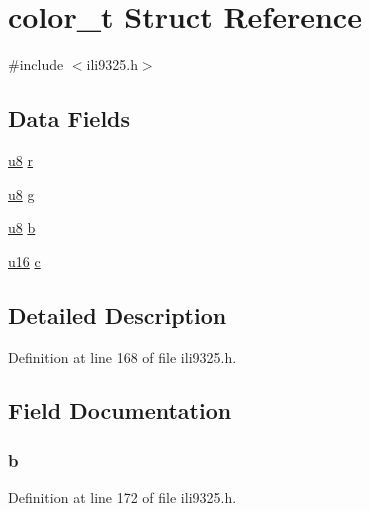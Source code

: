 \hypertarget{structcolor__t}{\section{color\-\_\-t Struct Reference}
\label{structcolor__t}
}


{\ttfamily \#include $<$ili9325.\-h$>$}

\subsection*{Data Fields}
\begin{DoxyCompactItemize}
\item 
\hyperlink{p8_2pinguino_2core_2typedef_8h_aed742c436da53c1080638ce6ef7d13de}{u8} \hyperlink{structcolor__t_a024565753c9b4a462348578bb2fe6757}{r}
\item 
\hyperlink{p8_2pinguino_2core_2typedef_8h_aed742c436da53c1080638ce6ef7d13de}{u8} \hyperlink{structcolor__t_a2e3999b42bd5cf9f9e7d87ef7c135544}{g}
\item 
\hyperlink{p8_2pinguino_2core_2typedef_8h_aed742c436da53c1080638ce6ef7d13de}{u8} \hyperlink{structcolor__t_a78ae961558b7587c97d0a87da7d56c4d}{b}
\item 
\hyperlink{p8_2pinguino_2core_2typedef_8h_a50b0d1c7a54fa09a64a3ac111c778520}{u16} \hyperlink{structcolor__t_afff0ae4fe505f5b27afed49e21dea41d}{c}
\end{DoxyCompactItemize}


\subsection{Detailed Description}


Definition at line 168 of file ili9325.\-h.



\subsection{Field Documentation}
\hypertarget{structcolor__t_a78ae961558b7587c97d0a87da7d56c4d}{
\subsubsection[{b}]{ b}}\label{structcolor__t_a78ae961558b7587c97d0a87da7d56c4d}


Definition at line 172 of file ili9325.\-h.



